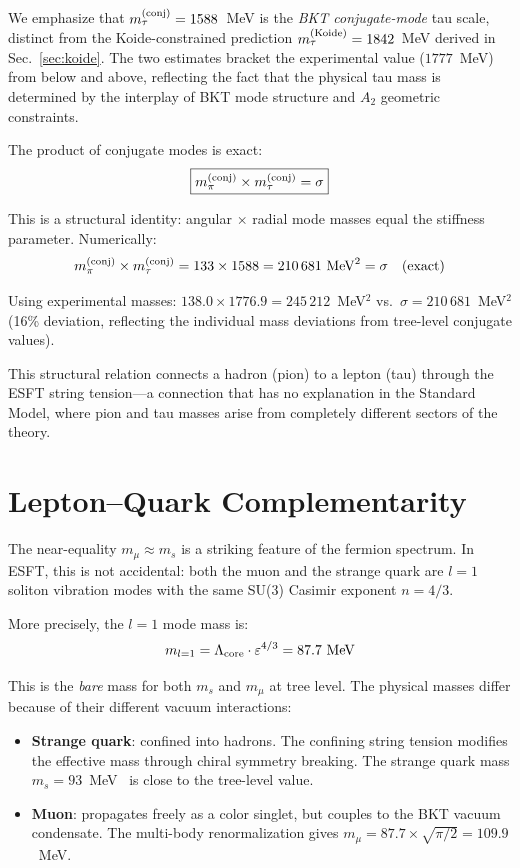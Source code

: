 ﻿\documentclass[twocolumn,preprintnumbers,amsmath,amssymb]{revtex4-2}
\begin{document}
We emphasize that $m_\tau^{(\rm conj)} = 1588$~MeV is the \emph{BKT conjugate-mode} tau scale, distinct from the Koide-constrained prediction $m_\tau^{(\rm Koide)} = 1842$~MeV derived in Sec.~\ref{sec:koide}. The two estimates bracket the experimental value ($1777$~MeV) from below and above, reflecting the fact that the physical tau mass is determined by the interplay of BKT mode structure and $A_2$ geometric constraints.

The product of conjugate modes is exact:
\begin{equation}
\boxed{m_\pi^{(\rm conj)} \times m_\tau^{(\rm conj)} = \sigma}
\label{eq:pitau}
\end{equation}

This is a structural identity: angular $\times$ radial mode masses equal the stiffness parameter. Numerically:
\begin{equation}
m_\pi^{(\rm conj)} \times m_\tau^{(\rm conj)} = 133 \times 1588 = 210\,681~\text{MeV}^2 = \sigma \quad (\text{exact})
\end{equation}

Using experimental masses: $138.0 \times 1776.9 = 245\,212$~MeV$^2$ vs.\ $\sigma = 210\,681$~MeV$^2$ (16\% deviation, reflecting the individual mass deviations from tree-level conjugate values).

This structural relation connects a hadron (pion) to a lepton (tau) through the ESFT string tension---a connection that has no explanation in the Standard Model, where pion and tau masses arise from completely different sectors of the theory.

\section{Lepton--Quark Complementarity}
\label{sec:complementarity}

The near-equality $m_\mu \approx m_s$ is a striking feature of the fermion spectrum. In ESFT, this is not accidental: both the muon and the strange quark are $l = 1$ soliton vibration modes with the same SU(3) Casimir exponent $n = 4/3$.

More precisely, the $l = 1$ mode mass is:
\begin{equation}
m_{l=1} = \Lambda_{\rm core} \cdot \varepsilon^{4/3} = 87.7~\text{MeV}
\end{equation}

This is the \emph{bare} mass for both $m_s$ and $m_\mu$ at tree level. The physical masses differ because of their different vacuum interactions:
\begin{itemize}
\item \textbf{Strange quark}: confined into hadrons. The confining string tension modifies the effective mass through chiral symmetry breaking. The strange quark mass $m_s = 93$~MeV~\cite{PDG2024} is close to the tree-level value.
\item \textbf{Muon}: propagates freely as a color singlet, but couples to the BKT vacuum condensate. The multi-body renormalization gives $m_\mu = 87.7 \times \sqrt{\pi/2} = 109.9$~MeV.
\end{itemize}
\end{document}
